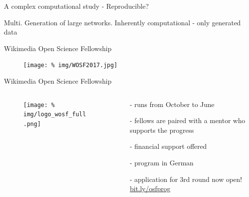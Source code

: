 
\begin{frame}{A complex computational study - Reproducible?}

  Multi. Generation of large networks. Inherently computational - only generated data
  
  
  
\end{frame}



\begin{frame}{Wikimedia Open Science Fellowship}

  \begin{figure}
    \centering
    \texttt{[image: \%
    img/WOSF2017.jpg]} %
  \end{figure}
  



\end{frame}




\begin{frame}{Wikimedia Open Science Fellowship}

  \begin{columns}
    \begin{column}{.55\textwidth}


      \begin{figure}
        \centering
        \texttt{[image: \%
        img/logo\_wosf\_full.png]} %
      \end{figure}
      

      
      

    \end{column}
    \begin{column}{.45\textwidth}
      \minipage[c][0.625\textheight][s]{\columnwidth}

      \vspace{0.2cm}
      
      \begin{itemize}[leftmargin=*]

      \item[-] runs from October to June

      \item[-] fellows are paired with a mentor who supports the progress

      \item[-] financial support offered

      \item[-] program in German

      \item[-]       application for 3rd round now open!
      \href{http://bit.ly/osfprog}{bit.ly/osfprog}


      \end{itemize}

      

      \endminipage      
    \end{column}
  \end{columns}
  
\end{frame}

